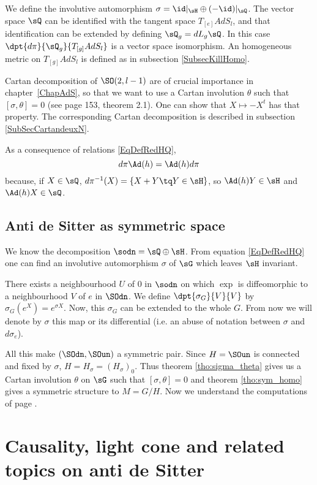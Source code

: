 We define the involutive automorphism $\sigma=\id|_{\sH}\oplus(-\id)|_{\sQ}$.  The vector space $\sQ$ can be identified with the tangent space $T_{[e]}AdS_l$, and that identification can be extended by defining $\sQ_g=dL_g\sQ$. In this case $\dpt{d\pi}{\sQ_g}{T_{[g]}AdS_l}$ is a vector space isomorphism.\label{PgdpibaseQTgM} An homogeneous metric on $T_{[g]}AdS_l$ is defined as in subsection \ref{SubsecKillHomo}.

Cartan decomposition of $\SO(2,l-1)$ are of crucial importance in chapter~\ref{ChapAdS}, so that we want to use a Cartan involution $\theta$ such that $[\sigma,\theta]=0$ (see \cite{Loos} page 153, theorem 2.1). One can show that $X\mapsto -X^t$ has that property. The corresponding Cartan decomposition is described in subsection \ref{SubSecCartandeuxN}.

As a consequence of relations \eqref{EqDefRedHQ}, 
\begin{equation}  \label{EqdpiAdpi}
d\pi\Ad(h)=\Ad(h) d\pi
\end{equation}
because, if $X\in\sQ$, $d\pi^{-1}(X)=\{ X+Y\tq Y\in\sH \}$, so $\Ad(h)Y\in\sH$ and $\Ad(h)X\in \sQ$.

\subsection{Anti de Sitter as symmetric space}
\label{pg:AdS_n_syme}

We know the decomposition $\sodn=\sQ\oplus\sH$. From equation \eqref{EqDefRedHQ} one can find an involutive automorphism $\sigma$ of $\sG$ which leaves $\sH$ invariant. 

There exists a neighbourhood $U$ of $0$ in $\sodn$ on which $\exp$ is diffeomorphic to a neighbourhood $V$ of $e$ in $\SOdn$. We define $\dpt{\sigma_G}{V}{V}$ by $\sigma_G(e^X)=e^{\sigma X}$. Now, this $\sigma_G$ can be extended to the whole $G$. From now we will denote by $\sigma$ this map or its differential (i.e. an abuse of notation between $\sigma$ and $d\sigma_e$).

  
All this make $(\SOdn,\SOun)$ a symmetric pair. Since $H=\SOun$ is connected and fixed by $\sigma$, $H=H_{\sigma}=(H_{\sigma})_0$. Thus theorem  \ref{tho:sigma_theta} gives us a Cartan involution $\theta$ on $\sG$ such that $[\sigma,\theta]=0$ and theorem \ref{tho:sym_homo} gives a symmetric structure to $M=G/H$. Now we understand the computations of page \pageref{pg:calcul_sigma_theta}.


\section{Causality, light cone and related topics on anti de Sitter} \label{SecCausal}

